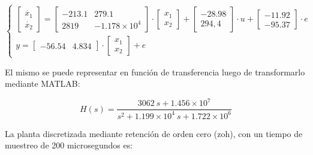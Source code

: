 \vspace{-0.5cm}
\begin{equation}
    \begin{cases}
        \begin{bmatrix}
            \dot{x_1}\\
            \dot{x_2}
        \end{bmatrix}
        =
        \begin{bmatrix}
            -213.1  &   279.1\\
            2819    &   -1.178\times 10^4
        \end{bmatrix}
        \cdot
        \begin{bmatrix}
            x_1 \\
            x_2
        \end{bmatrix}
        +
        \begin{bmatrix}
            -28.98 \\
            294,4
        \end{bmatrix}
        \cdot
        u 
        +
        \begin{bmatrix}
            -11.92 \\
            -95.37
        \end{bmatrix}
        \cdot
        e
        \\
        y =
        \begin{bmatrix}
            -56.54 & 4.834
        \end{bmatrix}
        \cdot
        \begin{bmatrix}
            x_1 \\
            x_2
        \end{bmatrix}
        +
        e

    \end{cases}
\end{equation}

El mismo se puede representar en función de transferencia luego de transformarlo mediante MATLAB:

\vspace{-0.5cm}
\begin{equation}
    H(s) = \dfrac{3062\ s + 1.456 \times 10^7}{s^2 + 1.199 \times 10^4\ s + 1.722 \times 10^6}
\end{equation}
\vspace{-0.5cm}

La planta discretizada mediante retención de orden cero (zoh), con un tiempo de muestreo de 200
microsegundos es:

